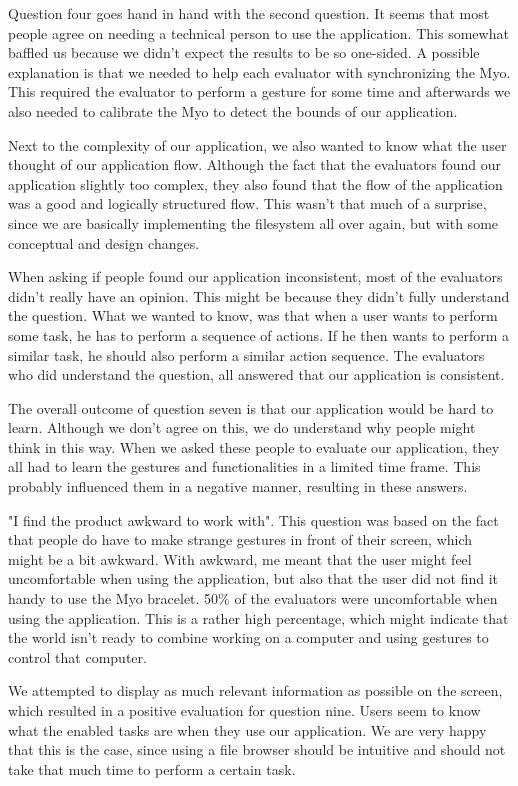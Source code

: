 \documentclass{article}
\begin{document}
Question four goes hand in hand with the second question. It seems that most people agree on needing a technical person to use the application. This somewhat baffled us because we didn't expect the results to be so one-sided. A possible explanation is that we needed to help each evaluator with synchronizing the Myo. This required the evaluator to perform a gesture for some time and afterwards we also needed to calibrate the Myo to detect the bounds of our application.

Next to the complexity of our application, we also wanted to know what the user thought of our application flow. Although the fact that the evaluators found our application slightly too complex, they also found that the flow of the application was a good and logically structured flow. This wasn't that much of a surprise, since we are basically implementing the filesystem all over again, but with some conceptual and design changes.

When asking if people found our application inconsistent, most of the evaluators didn't really have an opinion. This might be because they didn't fully understand the question. What we wanted to know, was that when a user wants to perform some task, he has to perform a sequence of actions. If he then wants to perform a similar task, he should also perform a similar action sequence. The evaluators who did understand the question, all answered that our application is consistent.

The overall outcome of question seven is that our application would be hard to learn. Although we don't agree on this, we do understand why people might think in this way. When we asked these people to evaluate our application, they all had to learn the gestures and functionalities in a limited time frame. This probably influenced them in a negative manner, resulting in these answers.

"I find the product awkward to work with". This question was based on the fact that people do have to make strange gestures in front of their screen, which might be a bit awkward. With awkward, me meant that the user might feel uncomfortable when using the application, but also that the user did not find it handy to use the Myo bracelet. 50\% of the evaluators were uncomfortable when using the application. This is a rather high percentage, which might indicate that the world isn't ready to combine working on a computer and using gestures to control that computer.

We attempted to display as much relevant information as possible on the screen, which resulted in a positive evaluation for question nine. Users seem to know what the enabled tasks are when they use our application. We are very happy that this is the case, since using a file browser should be intuitive and should not take that much time to perform a certain task.
\end{document}
